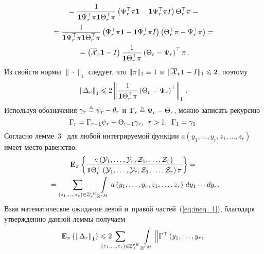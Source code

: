 \begin{multicols}{2}
{\noindent
\begin{multline*}
{} = 
\displaystyle\frac{\displaystyle 1\mathstrut}{\displaystyle \mathbf{1}\Psi_r^{\top}\pi \mathbf{1}\Theta_r^{\top}\pi\mathstrut} 
\left(\Psi_r^{\top}\pi\mathbf{1} - \mathbf{1}\Psi_r^{\top}\pi I\right) \Theta_r^{\top}\pi ={}\\
{}=
\displaystyle\frac{\displaystyle 1\mathstrut}{\displaystyle \mathbf{1}\Psi_r^{\top}\pi \mathbf{1}\Theta_r^{\top}\pi\mathstrut} 
\left(\Psi_r^{\top}\pi\mathbf{1} - \mathbf{1}\Psi_r^{\top}\pi I\right) 
\left(\Theta_r^{\top}\pi - \Psi_r^{\top}\pi\right) ={} \\
{} = 
\left(\overline{\mathcal{X}}_r \mathbf{1} - I\right) \displaystyle\frac{\displaystyle 1\mathstrut}{\displaystyle \mathbf{1}\Theta_r^{\top}\pi\mathstrut}
\left(\Theta_r - \Psi_r\right)^{\top}\pi\,.
\end{multline*}
Из свойств нормы $\|\cdot\|_1$ следует, что $\|\pi\|_1\hm \equiv 1$ и~$\| 
\overline{\mathcal{X}}_r \mathbf{1} \hm- I\|_1 \hm\leqslant 2$, поэтому
\begin{equation}
\left\|\Delta_r\right\|_1 \leqslant 2\left\| \displaystyle\frac{\displaystyle 1\mathstrut}{\displaystyle \mathbf{1}\Theta_r^{\top}\pi\mathstrut}
\left(\Theta_r - \Psi_r\right)^{\top} \right\|_1\,.
\label{eq:ineq_1}
\end{equation}
Используя обозначения
$\gamma_r \ebd \psi_r\hm - \theta_r$ и~$\Gamma_r \hm\ebd \Psi_r \hm- \Theta_r$,
мож\-но записать рекурсию
\begin{equation}
\Gamma_r =  \Gamma_{r-1}\psi_r+\Theta_{r-1} \gamma_r,  \enskip  r > 1, \enskip
\Gamma_1 = \gamma_1.
\label{eq:rec_1}
\end{equation}
Согласно лемме~3~\cite{B_20_1_ARC} для любой интегрируемой функции 
$a\left(y_1,\ldots,y_r, z_1,\ldots,z_r\right)$ имеет мес\-то равенство:
\begin{multline*} 
\mathbf{E}_{ \pi }\left\{ \mathop{\displaystyle\frac{\displaystyle a\left(\mathcal{Y}_1,\ldots,\mathcal{Y}_r, 
\mathcal{Z}_1,\ldots,\mathcal{Z}_r\right)\mathstrut}{\displaystyle \mathbf{1}\Theta_r^{\top}\left(\mathcal{Y}_1,\ldots,\mathcal{Y}_r, 
\mathcal{Z}_1,\ldots,\mathcal{Z}_r\right)\pi\mathstrut}} \right\} ={}\\
{}=
\sum\limits_{(z_1,\ldots, z_r) \in \mathbb{Z}_+^{rK}} \int\limits_{\mathbb{R}^{rM}}
a\left(y_1,\ldots,y_r, z_1,\ldots,z_r\right) \,dy_1\cdots dy_r.\hspace*{-0.70177pt}
\end{multline*}
Взяв математическое ожидание левой и~правой час\-тей~(\ref{eq:ineq_1}), благодаря 
утверж\-де\-нию данной леммы получаем
\begin{multline}
\me{\pi}{\left\|\Delta_r\right\|_1} \leqslant  2 \!\!\!\!\!\!\!\!\!\!\sum\limits_{(z_1,\ldots, z_r) \in 
\mathbb{Z}_+^{rK}} \int\limits_{\,\mathbb{R}^{rM}}
\Big\|\Gamma^{\top}\left(y_1,\ldots,y_r,\right.\\

\end{multline}}
\end{multicols}
